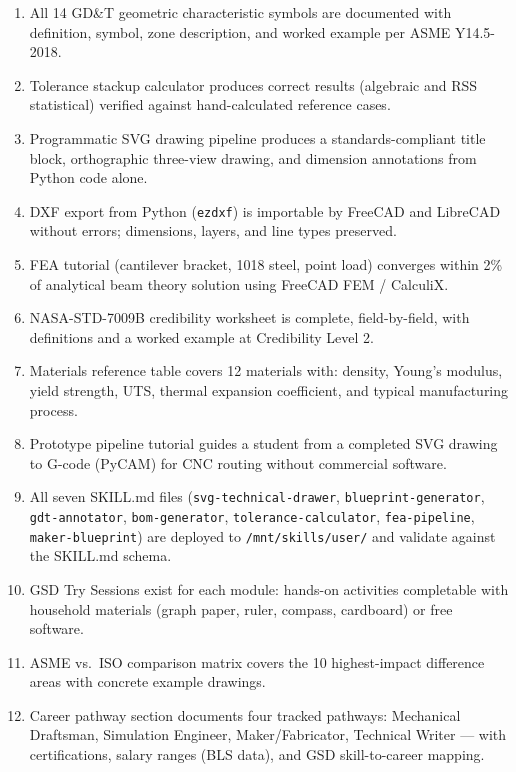 \documentclass[11pt,letterpaper]{article}
\begin{document}
\begin{enumerate}
  \item All 14 GD\&T geometric characteristic symbols are documented with definition, symbol, zone description, and worked example per ASME Y14.5-2018.
  \item Tolerance stackup calculator produces correct results (algebraic and RSS statistical) verified against hand-calculated reference cases.
  \item Programmatic SVG drawing pipeline produces a standards-compliant title block, orthographic three-view drawing, and dimension annotations from Python code alone.
  \item DXF export from Python (\texttt{ezdxf}) is importable by FreeCAD and LibreCAD without errors; dimensions, layers, and line types preserved.
  \item FEA tutorial (cantilever bracket, 1018 steel, point load) converges within 2\% of analytical beam theory solution using FreeCAD FEM / CalculiX.
  \item NASA-STD-7009B credibility worksheet is complete, field-by-field, with definitions and a worked example at Credibility Level 2.
  \item Materials reference table covers 12 materials with: density, Young's modulus, yield strength, UTS, thermal expansion coefficient, and typical manufacturing process.
  \item Prototype pipeline tutorial guides a student from a completed SVG drawing to G-code (PyCAM) for CNC routing without commercial software.
  \item All seven SKILL.md files (\texttt{svg-technical-drawer}, \texttt{blueprint-generator}, \texttt{gdt-annotator}, \texttt{bom-generator}, \texttt{tolerance-calculator}, \texttt{fea-pipeline}, \texttt{maker-blueprint}) are deployed to \texttt{/mnt/skills/user/} and validate against the SKILL.md schema.
  \item GSD Try Sessions exist for each module: hands-on activities completable with household materials (graph paper, ruler, compass, cardboard) or free software.
  \item ASME vs.\ ISO comparison matrix covers the 10 highest-impact difference areas with concrete example drawings.
  \item Career pathway section documents four tracked pathways: Mechanical Draftsman, Simulation Engineer, Maker/Fabricator, Technical Writer --- with certifications, salary ranges (BLS data), and GSD skill-to-career mapping.
\end{enumerate}
\end{document}
